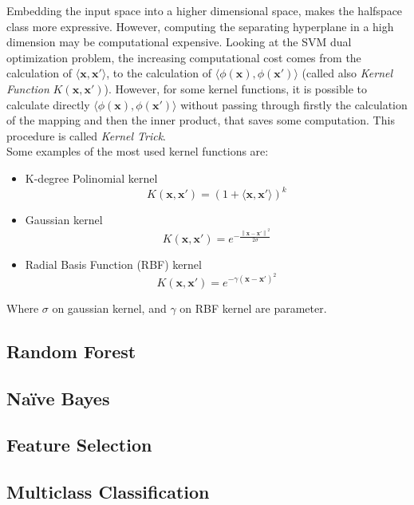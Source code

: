 Embedding the input space into a higher dimensional space, makes the halfspace class more expressive. However, computing the separating hyperplane in a high dimension may be computational expensive. Looking at the SVM dual optimization problem, the increasing computational cost comes from the calculation of $\langle \mathbf{x}, \mathbf{x}' \rangle$, to the calculation of $\langle \phi(\mathbf{x}), \phi(\mathbf{x}') \rangle$ (called also \textit{Kernel Function} $K(\mathbf{x}, \mathbf{x}')$). However, for some kernel functions, it is possible to calculate directly $\langle \phi(\mathbf{x}), \phi(\mathbf{x}') \rangle$ without passing through firstly the calculation of the mapping and then the inner product, that saves some computation. This procedure is called \textit{Kernel Trick}.\\
Some examples of the  most used kernel functions are:
\begin{itemize}
	\item K-degree Polinomial kernel
	\[K(\mathbf{x}, \mathbf{x}') = (1 + \langle \mathbf{x}, \mathbf{x}' \rangle)^k\]
	\item Gaussian kernel 
	\[K(\mathbf{x}, \mathbf{x}') = e^{- \frac{\left\lVert \mathbf{x} - \mathbf{x}' \right\rVert^2}{2 \sigma}} \]
	\item Radial Basis Function (RBF) kernel
	\[K(\mathbf{x}, \mathbf{x}') = e^{- \gamma \left( \mathbf{x} - \mathbf{x}' \right)^2} \]
\end{itemize}
Where $\sigma$ on gaussian kernel, and $\gamma$ on RBF kernel are parameter.




\subsection{Random Forest}

\subsection{Na{\"i}ve Bayes}

\subsection{Feature Selection}

\subsection{Multiclass Classification}




